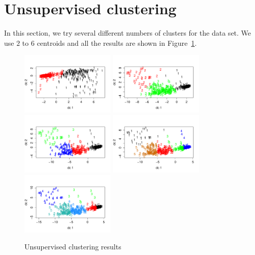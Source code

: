 \documentclass[12pt]{article}
\begin{document}
\section{Unsupervised clustering}
In this section, we try several different numbers of clusters for the data set. We use $2$ to $6$ centroids and all the results are shown in Figure~\ref{fig:kcenter1}.
\begin{figure}
	\centering
	\includegraphics[width=0.4\textwidth]{2.pdf}
	\includegraphics[width=0.4\textwidth]{3.pdf}
	\includegraphics[width=0.4\textwidth]{4.pdf}
	\includegraphics[width=0.4\textwidth]{5.pdf}
	\includegraphics[width=0.4\textwidth]{6.pdf}
	\caption{Unsupervised clustering results}
	\label{fig:kcenter1}
\end{figure}
\end{document}
